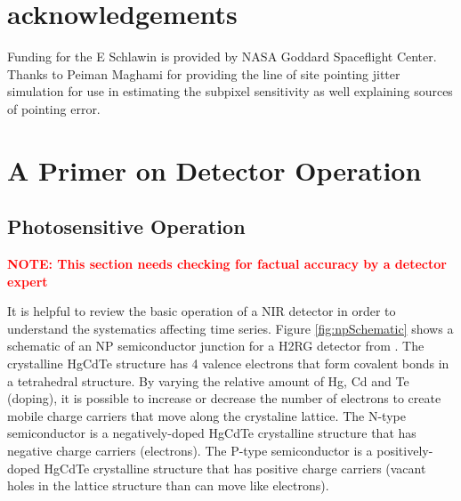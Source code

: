 \documentclass[]{aastex62}
\begin{document}
\acknowledgments

\section*{acknowledgements}
Funding for the E Schlawin is provided by NASA Goddard Spaceflight Center.
Thanks to Peiman Maghami for providing the line of site pointing jitter simulation for use in estimating the subpixel sensitivity as well explaining sources of pointing error.


\appendix


\section{A Primer on Detector Operation}\label{sec:detectorPrimer}

\subsection{Photosensitive Operation}
\textcolor{red}{\textbf{NOTE: This section needs checking for factual accuracy by a detector expert}}

It is helpful to review the basic operation of a NIR detector \citep[e.g.][]{rieke2007irDetectorReview} in order to understand the systematics affecting time series.
Figure \ref{fig:npSchematic} shows a schematic of an NP semiconductor junction for a H2RG detector from \citet{smith2008imgPersistence}.
The crystalline HgCdTe structure has 4 valence electrons that form covalent bonds in a tetrahedral structure.
By varying the relative amount of Hg, Cd and Te (doping), it is possible to increase or decrease the number of electrons to create mobile charge carriers that move along the crystaline lattice.
The N-type semiconductor is a negatively-doped HgCdTe crystalline structure that has negative charge carriers (electrons).
The P-type semiconductor is a positively-doped HgCdTe crystalline structure that has positive charge carriers (vacant holes in the lattice structure than can move like electrons).
\end{document}
